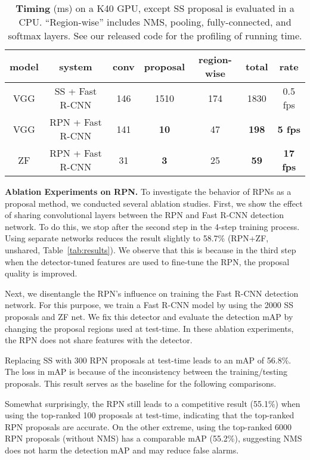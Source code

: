 \documentclass[10pt,journal,cspaper,compsoc]{IEEEtran}
\begin{document}
\begin{table*}[t]
\begin{center}
\caption{\textbf{Timing} (ms) on a K40 GPU, except SS proposal is evaluated in a CPU. ``Region-wise'' includes NMS, pooling, fully-connected, and softmax layers. See our released code for the profiling of running time.}
\vspace{-1em}
\small
\begin{tabular}{c|c|ccc|c|c}
  model & system & conv & proposal & region-wise & total & rate \\
  \hline\hline
  VGG & SS + Fast R-CNN & 146 & 1510 & 174 & 1830 & 0.5 fps \\
  VGG & RPN + Fast R-CNN & 141 & \textbf{10} & 47 & \textbf{198} & \textbf{5 fps} \\
  \hline
  ZF & RPN + Fast R-CNN & 31 & \textbf{3} & 25 & \textbf{59}  & \textbf{17 fps}\\
\end{tabular}
\label{tab:time}
\end{center}
\end{table*}

\vspace{.5em}
\noindent\textbf{Ablation Experiments on RPN.}
To investigate the behavior of RPNs as a proposal method, we conducted several ablation studies.
First, we show the effect of sharing convolutional layers between the RPN and Fast R-CNN detection network.
To do this, we stop after the second step in the 4-step training process.
Using separate networks reduces the result slightly to 58.7\% (RPN+ZF, unshared, Table~\ref{tab:results}).
We observe that this is because in the third step when the detector-tuned features are used to fine-tune the RPN, the proposal quality is improved.

Next, we disentangle the RPN's influence on training the Fast R-CNN detection network.
For this purpose, we train a Fast R-CNN model by using the 2000 SS proposals and ZF net.
We fix this detector and evaluate the detection mAP by changing the proposal regions used at test-time.
In these ablation experiments, the RPN does not share features with the detector.

Replacing SS with 300 RPN proposals at test-time leads to an mAP of 56.8\%. The loss in mAP is because of the inconsistency between the training/testing proposals. This result serves as the baseline for the following comparisons.

Somewhat surprisingly, the RPN still leads to a competitive result (55.1\%) when using the top-ranked 100 proposals at test-time, indicating that the top-ranked RPN proposals are accurate. On the other extreme, using the top-ranked 6000 RPN proposals (without NMS) has a comparable mAP (55.2\%), suggesting NMS does not harm the detection mAP and may reduce false alarms.
\end{document}
